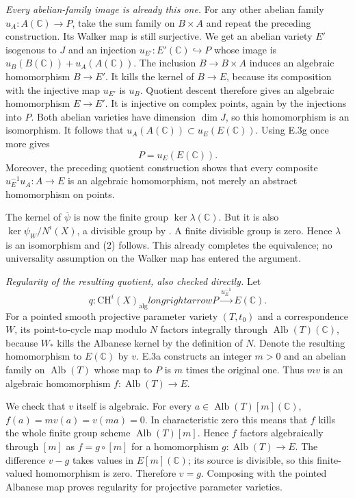 \emph{Every abelian-family image is already this one.}
For any other abelian family $u_A:A(\mathbb C)\to P$, take
the sum family on $B\times A$ and repeat the preceding
construction. Its Walker map is still surjective. We get an
abelian variety $E'$ isogenous to $J$ and an injection
$u_{E'}:E'(\mathbb C)\hookrightarrow P$ whose image is
$u_B(B(\mathbb C))+u_A(A(\mathbb C))$.
The inclusion $B\to B\times A$ induces an algebraic
homomorphism $B\to E'$. It kills the kernel of $B\to E$,
because its composition with the injective map $u_{E'}$
is $u_B$. Quotient descent therefore gives an algebraic
homomorphism $E\to E'$. It is injective on complex points,
again by the injections into $P$. Both abelian varieties have
dimension $\dim J$, so this homomorphism is an isomorphism.
It follows that $u_A(A(\mathbb C))\subset u_E(E(\mathbb C))$.
Using E.3g once more gives
\[
                         P=u_E(E(\mathbb C)).
\]
Moreover, the preceding quotient construction shows that
every composite $u_E^{-1}u_A:A\to E$ is an algebraic
homomorphism, not merely an abstract homomorphism on points.

The kernel of $\overline\psi$ is now the finite group
$\ker\lambda(\mathbb C)$. But it is also
$\ker\psi_W/N^i(X)$, a divisible group by
\citet[Theorem 2.3, author p.~12]{cyACMVWalker2022}.
A finite divisible group is zero. Hence $\lambda$ is an
isomorphism and (2) follows. This already completes the
equivalence; no universality assumption on the Walker map
has entered the argument.

\emph{Regularity of the resulting quotient, also checked directly.}
Let
\[
 q:\mathrm{CH}^i(X)_{\mathrm{alg}}longrightarrow P
                       \xrightarrow{u_E^{-1}}E(\mathbb C).
\]
For a pointed smooth projective parameter variety $(T,t_0)$
and a correspondence $W$, its point-to-cycle map modulo $N$
factors integrally through $\operatorname{Alb}(T)(\mathbb C)$,
because $W_*$ kills the Albanese kernel by the definition of
$N$. Denote the resulting homomorphism to $E(\mathbb C)$ by
$v$. E.3a constructs an integer $m>0$ and an abelian family
on $\operatorname{Alb}(T)$ whose map to $P$ is $m$ times
the original one. Thus $mv$ is an algebraic homomorphism
$f:\operatorname{Alb}(T)\to E$.

We check that $v$ itself is algebraic. For every
$a\in\operatorname{Alb}(T)[m](\mathbb C)$,
$f(a)=mv(a)=v(ma)=0$. In characteristic zero this means
that $f$ kills the whole finite group scheme
$\operatorname{Alb}(T)[m]$. Hence $f$ factors algebraically
through $[m]$ as $f=g\circ[m]$ for a homomorphism
$g:\operatorname{Alb}(T)\to E$. The difference $v-g$ takes
values in $E[m](\mathbb C)$; its source is divisible, so this
finite-valued homomorphism is zero. Therefore $v=g$.
Composing with the pointed Albanese map proves regularity
for projective parameter varieties.

